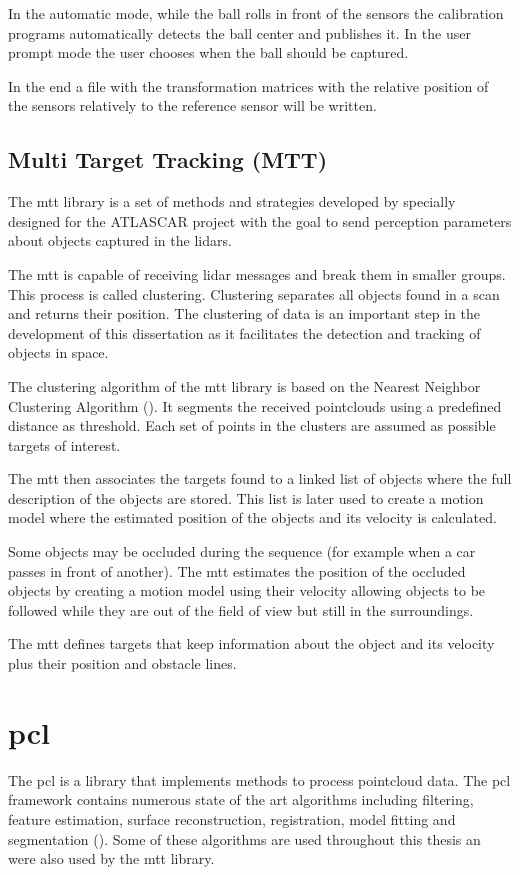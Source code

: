 In the automatic mode, while the ball rolls in front of the sensors the calibration programs automatically detects the ball center and publishes it. In the user prompt mode the user chooses when the ball should be captured.

In the end a file with the transformation matrices with the relative position of the sensors relatively to the reference sensor will be written.

\subsection{Multi Target Tracking (MTT)}

The \gls{mtt} library is a set of methods and strategies developed by \cite{SoaresDeAlmeida2016a} specially designed for the ATLASCAR project with the goal to send perception parameters about objects captured in the \gls{lidar}s. 

The \gls{mtt} is capable of receiving \gls{lidar} messages and break them in smaller groups. This process is called clustering. Clustering separates all objects found in a scan and returns their position. The clustering of data is an important step in the development of this dissertation as it facilitates the detection and tracking of objects in space. 

The clustering algorithm of the \gls{mtt} library is based on the Nearest Neighbor Clustering Algorithm (\cite{Luo}). It segments the received pointclouds using a predefined distance as threshold. Each set of points in the clusters are assumed as possible targets of interest.

The \gls{mtt} then associates the targets found to a linked list of objects where the full description of the objects are stored. This list is later used to create a motion model where the estimated position of the objects and its velocity is calculated. 

Some objects may be occluded during the sequence (for example when a car passes in front of another). The \gls{mtt} estimates the position of the occluded objects by creating a motion model using their velocity allowing objects to be followed while they are out of the field of view but still in the surroundings.

The \gls{mtt} defines targets that keep information about the object and its velocity plus their position and obstacle lines.

\section{\gls{pcl}}

The \gls{pcl} is a library that implements methods to process pointcloud data. The \gls{pcl} framework contains numerous state of the art algorithms including filtering, feature estimation, surface reconstruction, registration, model fitting and segmentation (\cite{PointCloudLibrary2018}). Some of these algorithms are used throughout this thesis an were also used by the \gls{mtt} library.



 








